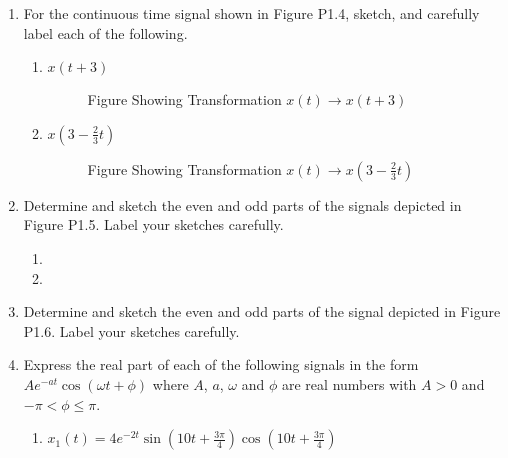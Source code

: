 \begin{enumerate}
\begin{enumerate}
    \end{enumerate}

  \item For the continuous time signal shown in Figure P1.4, sketch, and carefully label each of the following.

    \begin{enumerate}

      \item $x(t+3)$

        \begin{figure}[H]
          \centering
          
          \caption{Figure Showing Transformation $x(t)\to x(t+3)$}
          \label{fig:10}
        \end{figure}

      \item $x\left( 3-\frac{2}{3}t \right)$

        \begin{figure}[H]
          \centering
          
          \caption{Figure Showing Transformation $x(t)\to x\left( 3-\frac{2}{3}t \right)$}
          \label{fig:11}
        \end{figure}

    \end{enumerate}

  \item Determine and sketch the even and odd parts of the signals depicted in Figure P1.5. Label your sketches carefully.

    \begin{enumerate}

      \item 

      \item 

    \end{enumerate}

  \item Determine and sketch the even and odd parts of the signal depicted in Figure P1.6. Label your sketches carefully.

  \item Express the real part of each of the following signals in the form $Ae^{-at}\cos(\omega t + \phi)$ where $A$, $a$, $\omega$ and $\phi$ are real numbers with $A > 0$ and $-\pi < \phi \leq \pi$.

    \begin{enumerate}

      \item $x_1(t)=4e^{-2t}\sin\left( 10t+\frac{3\pi}{4}\right)\cos\left( 10t+\frac{3\pi}{4} \right)$


\end{enumerate}
\end{enumerate}
